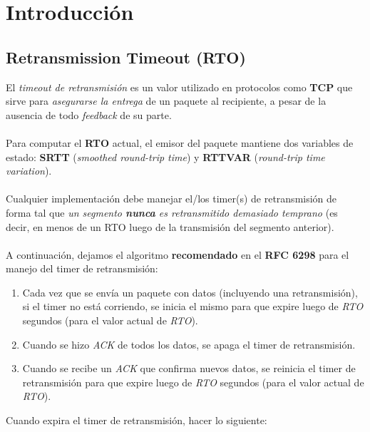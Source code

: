 \section{Introducción}

\subsection{Retransmission Timeout (RTO)}

El \textit{timeout de retransmisión} es un valor utilizado en protocolos como
\textbf{TCP} que sirve para \textit{asegurarse la entrega} de un paquete al
recipiente, a pesar de la ausencia de todo \textit{feedback} de su parte.\\
\\
\indent Para computar el \textbf{RTO} actual, el emisor del paquete mantiene dos
variables
de estado: \textbf{SRTT} (\textit{smoothed round-trip time}) y \textbf{RTTVAR}
(\textit{round-trip time variation}).\\
\\
\indent Cualquier implementación debe manejar el/los timer(s) de retransmisión
de forma tal que \textit{un segmento \textbf{nunca} es retransmitido demasiado
temprano} (es decir, en menos de un RTO luego de la transmisión del segmento
anterior).\\
\\
\indent A continuación, dejamos el algoritmo \textbf{recomendado} en el
\textbf{RFC 6298} para el manejo del timer de retransmisión:
\begin{enumerate}
 \item Cada vez que se envía un paquete con datos (incluyendo una
	retransmisión), si el timer no está corriendo, se inicia el mismo para
	que expire luego de \textit{RTO} segundos (para el valor actual de
	\textit{RTO}).
 \item Cuando se hizo \textit{ACK} de todos los datos, se apaga el timer de
	retransmisión.
 \item Cuando se recibe un \textit{ACK} que confirma nuevos datos, se reinicia
	el timer de retransmisión para que expire luego de \textit{RTO}
	segundos (para el valor actual de \textit{RTO}).
\end{enumerate}
Cuando expira el timer de retransmisión, hacer lo siguiente:
